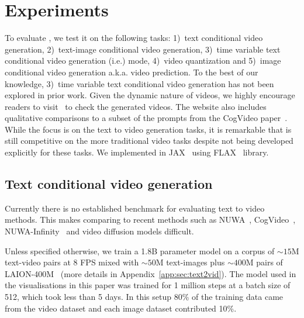 \section{Experiments}
\label{sec:exp}
To evaluate \model, we test it on the following tasks: 1)~text conditional video generation, 2)~text-image conditional video generation, 3)~time variable text conditional video generation (i.e.) \story mode, 4)~video quantization and 5)~image conditional video generation a.k.a. video prediction. To the best of our knowledge, 3)~time variable text conditional video generation has not been explored in prior work. Given the dynamic nature of videos, we highly encourage readers to visit \website\ to check the generated videos. The website also includes qualitative comparisons to a subset of the prompts from the CogVideo paper~\cite{cogvideo}. While the focus is on the text to video generation tasks, it is remarkable that \phenaki is still competitive on the more traditional video tasks despite not being developed explicitly for these tasks. We implemented \phenaki in JAX~\cite{jax2018github} using FLAX~\cite{flax2020github} library.
\subsection{Text conditional video generation} 
\label{sec:t2v}
Currently there is no established benchmark for evaluating text to video methods.
This makes comparing \phenaki to recent methods such as NUWA~\cite{nuwa}, CogVideo~\cite{cogvideo}, NUWA-Infinity~\cite{wu2022nuwa} and video diffusion models \cite{ho2022video} difficult. 

Unless specified otherwise, we train a 1.8B parameter \phenaki model on a corpus of ${\sim}15$M text-video pairs at 8 FPS mixed with ${\sim}50$M text-images plus ${\sim}400$M pairs of LAION-400M~\cite{schuhmann2021laion} (more details in Appendix~\ref{app:sec:text2vid}).  The model used in the visualisations in this paper was trained for 1 million steps at a batch size of 512, which took less than 5 days. In this setup 80\% of the training data came from the video dataset and each image dataset contributed 10\%.  

